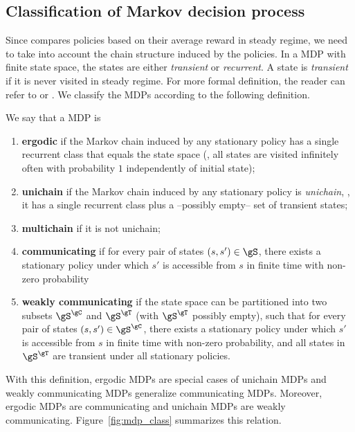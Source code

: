 \subsection{Classification of Markov decision process}
Since  compares policies based on their average reward in steady regime, we need to take into account the chain structure induced by the policies.
In a MDP with finite state space, the states are either \emph{transient} or \emph{recurrent}.
A state is \emph{transient} if it is never visited in steady regime.
For more formal definition, the reader can refer to \cite[Appendix~A]{puterman2014markov} or \cite{levin2017markov}.
We classify the MDPs according to the following definition.
\begin{defn}
    \label{ch:mdp:defn:mdp_class}
    We say that a MDP is
    \begin{enumerate}[label=(\roman*)]
        \item \textbf{ergodic} if the Markov chain induced by any stationary policy has a single recurrent class that equals the state space (\ie, all states are visited infinitely often with probability $1$ independently of initial state);
        \item \label{it:unichain} \textbf{unichain} if the Markov chain induced by any stationary policy is \emph{unichain}, \ie, it has a single recurrent class plus a --possibly empty-- set of transient states;
        \item \textbf{multichain} if it is not unichain;
        \item \textbf{communicating} if for every pair of states $(s,s')\in\gS$, there exists a stationary policy under which $s'$ is accessible from $s$ in finite time with non-zero probability
        \item \textbf{weakly communicating} if the state space can be partitioned into two subsets $\gS^{\gC}$ and $\gS^{\gT}$ (with $\gS^{\gT}$ possibly empty), such that for every pair of states $(s,s')\in\gS^{\gC}$, there exists a stationary policy under which $s'$ is accessible from $s$ in finite time with non-zero probability, and all states in $\gS^{\gT}$ are transient under all stationary policies.
    \end{enumerate}
\end{defn}
With this definition, ergodic MDPs are special cases of unichain MDPs and weakly communicating MDPs generalize communicating MDPs. 
Moreover, ergodic MDPs are communicating and unichain MDPs are weakly communicating.
Figure~\ref{fig:mdp_class} summarizes this relation.

